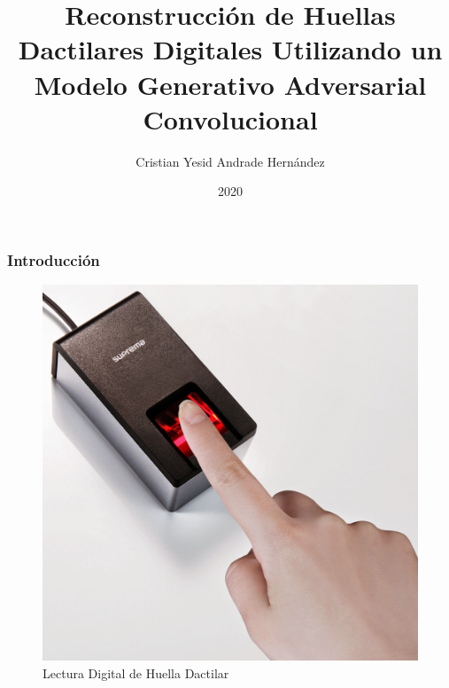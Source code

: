\documentclass{beamer}
\title{Reconstrucción de Huellas Dactilares Digitales Utilizando un Modelo Generativo Adversarial Convolucional}
\author{Cristian Yesid Andrade Hernández}
\institute{Universidad de los Andes}
\date{2020}
\begin{document}
\frame{\titlepage}

\begin{frame}
\frametitle{Introducción}

\begin{figure}[htbp]
\centerline{\includegraphics[scale=0.14]{figs/dedo_lector_biometrico.jpg}}
\caption{Lectura Digital de Huella Dactilar}
\label{fig1}
\end{figure}

\end{frame}
\end{document}
